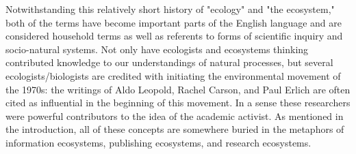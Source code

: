  Notwithstanding this relatively short history of "ecology" and "the ecosystem," both of the terms have become important parts of the English language and are considered household terms as well as referents to forms of scientific inquiry and socio-natural systems. Not only have ecologists and ecosystems thinking contributed knowledge to our understandings of natural processes, but several ecologists/biologists are credited with initiating the environmental movement of the 1970s: the writings of Aldo Leopold, Rachel Carson, and Paul Erlich are often cited as influential in the beginning of this movement. In a sense these researchers were powerful contributors to the idea of the academic activist. As mentioned in the introduction, all of these concepts are somewhere buried in the metaphors of information ecosystems, publishing ecosystems, and research ecosystems.


